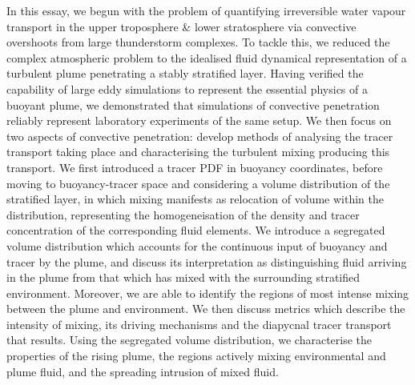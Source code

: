 \documentclass[a4paper]{article}
\begin{document}
In this essay, we begun with the problem of quantifying irreversible water vapour transport in the upper
troposphere \& lower stratosphere via convective overshoots from large thunderstorm complexes. To tackle this,
we reduced the complex atmospheric problem to the idealised fluid dynamical representation of a turbulent
plume penetrating a stably stratified layer. Having verified the capability of large eddy simulations to
represent the essential physics of a buoyant plume, we demonstrated that simulations of convective penetration
reliably represent laboratory experiments of the same setup. We then focus on two aspects of convective
penetration: develop methods of analysing the tracer transport taking place and characterising the turbulent
mixing producing this transport. We first introduced a tracer PDF in buoyancy coordinates, before moving to
buoyancy-tracer space and considering a volume distribution of the stratified layer, in which mixing manifests
as relocation of volume within the distribution, representing the homogeneisation of the density and tracer
concentration of the corresponding fluid elements. We introduce a segregated volume distribution which
accounts for the continuous input of buoyancy and tracer by the plume, and discuss its interpretation as
distinguishing fluid arriving in the plume from that which has mixed with the surrounding stratified environment.
Moreover, we are able to identify the regions of most intense mixing between the plume and environment. We
then discuss metrics which describe the intensity of mixing, its driving mechanisms and the diapycnal tracer
transport that results. Using the segregated volume distribution, we characterise the properties of the rising
plume, the regions actively mixing environmental and plume fluid, and the spreading intrusion of mixed fluid. 
\end{document}
